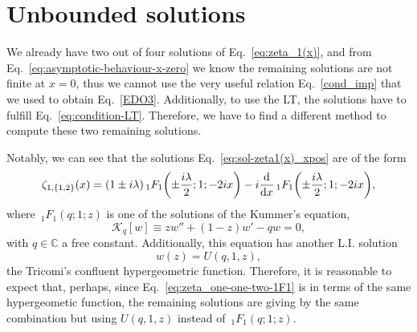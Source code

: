 \documentclass[
 aip,
 jmp,
 amsmath,amssymb,
 reprint,
 nofootinbib,
]{revtex4-2}
\begin{document}
\section{Unbounded solutions}

We already have two out of four solutions of Eq.~\eqref{eq:zeta_1(x)}, and from Eq.~\eqref{eq:asymptotic-behaviour-x-zero} we know the remaining solutions are not finite at $x = 0$, thus we cannot use the very useful relation Eq.~\eqref{cond_imp} that we used to obtain Eq.~\eqref{EDO3}. Additionally, to use the LT, the solutions have to fulfill Eq.~\eqref{eq:condition-LT}. Therefore, we have to find a different method to compute these two remaining solutions.

Notably, we can see that the solutions Eq.~\eqref{eq:sol-zeta1(x)_xpos} are of the form
\begin{equation} \label{eq:zeta_one-one-two-1F1}
    \zeta_{1,\{1,2\}}(x) = (1 \pm i \lambda) \,_1 F_1\qty(\pm \frac{i \lambda}{2}; 1; - 2 i x) - i \dv{x} \,_1 F_1 \qty(\pm \frac{i \lambda}{2}; 1; -2 i x),
\end{equation}
where $\,_1 F_1(q;1;z)$ is one of the solutions of the Kummer's equation,
\begin{equation}
    \mathcal{K}_q[w] \equiv z w'' + (1 - z) w' - q w = 0,%
    \label{eq:Kummer-equation}
\end{equation}
with $q \in \mathbb{C}$ a free constant. Additionally, this equation has another L.I. solution
\begin{equation}
    w(z) = U(q,1,z),
\end{equation}
the Tricomi's confluent hypergeometric function. Therefore, it is reasonable to expect that, perhaps, since Eq.~\eqref{eq:zeta_one-one-two-1F1} is in terms of the same hypergeometic function, the remaining solutions are giving by the same combination but using $U(q,1,z)$ instead of $\,_1 F_1(q;1;z)$.
\end{document}

